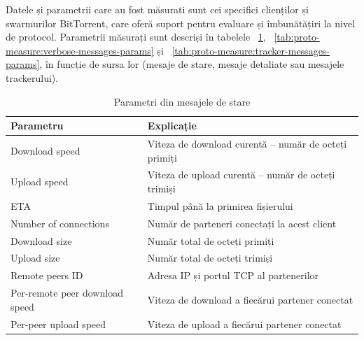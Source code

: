 Datele și parametrii care au fost măsurati sunt cei specifici clienților și
swarmurilor BitTorrent, care oferă suport pentru evaluare și îmbunătățiri la
nivel de protocol. Parametrii măsurați sunt descriși în tabelele
~\ref{tab:proto-measure:status-messages-params},
~\ref{tab:proto-measure:verbose-messages-params} și
~\ref{tab:proto-measure:tracker-messages-params}, în funcție de
sursa lor (mesaje de stare, mesaje detaliate sau mesajele trackerului).

\begin{table}[htb]
  \centering
  \caption{Parametri din mesajele de stare}
  \label{tab:proto-measure:status-messages-params}
  \begin{tabular}{@{}ll@{}}
    \toprule
      \textbf{Parametru} & \textbf{Explicație} \\
    \midrule
      Download speed & Viteza de download curentă -- număr de octeți primiți \\
      Upload speed & Viteza de upload curentă -- număr de octeți trimiși \\
      ETA & Timpul până la primirea fișierului \\
      Number of connections & Număr de parteneri conectați la acest client \\
      Download size & Număr total de octeți primiți \\
      Upload size & Număr total de octeți trimiși \\
      Remote peers ID & Adresa IP și portul TCP al partenerilor \\
      Per-remote peer download speed & Viteza de download a fiecărui
                                       partener conectat \\
      Per-peer upload speed & Viteza de upload a fiecărui partener conectat \\
    \bottomrule
  \end{tabular}
\end{table}

